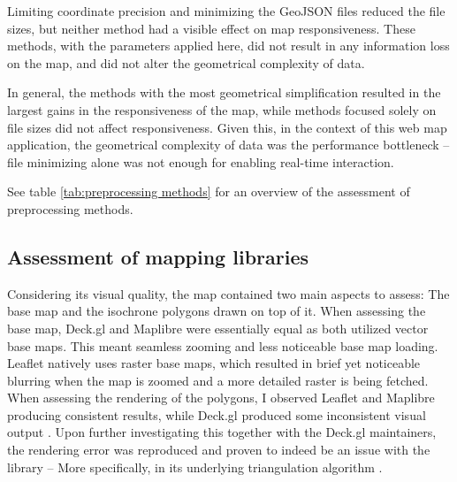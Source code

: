 Limiting coordinate precision and minimizing the GeoJSON files
reduced the file sizes,
but neither method had a visible effect on map responsiveness.
These methods, with the parameters applied here,
did not result in any information loss on the map,
and did not alter the geometrical complexity of data.

In general, the methods with the most geometrical simplification
resulted in the largest gains in the responsiveness of the map,
while methods focused solely on file sizes did not affect responsiveness.
Given this, in the context of this web map application,
the geometrical complexity of data was the performance bottleneck --
file minimizing alone was not enough for enabling real-time interaction.

See table \ref{tab:preprocessing methods} for
an overview of the assessment of preprocessing methods.




\subsection{Assessment of mapping libraries}


Considering its visual quality,
the map contained two main aspects to assess:
The base map and the isochrone polygons drawn on top of it.
When assessing the base map,
Deck.gl and Maplibre were essentially equal as both utilized vector base maps.
This meant seamless zooming and less noticeable base map loading.
Leaflet natively uses raster base maps, which resulted in brief yet noticeable
blurring when the map is zoomed and a more detailed raster is being fetched.
When assessing the rendering of the polygons,
I observed Leaflet and Maplibre producing consistent results,
while Deck.gl produced some inconsistent visual output .
Upon further investigating this together with the Deck.gl maintainers,
the rendering error was reproduced and proven to indeed be an issue with the library \parencite{deckbug} --
More specifically, in its underlying triangulation algorithm \parencite{earcutbug}.


